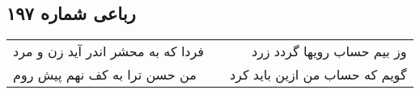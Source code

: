 \begin{center}
\section*{رباعی شماره ۱۹۷}
\label{sec:sh197}
\begin{longtable}{l p{0.5cm} r}
فردا که به محشر اندر آید زن و مرد
&&
وز بیم حساب رویها گردد زرد
\\
من حسن ترا به کف نهم پیش روم
&&
گویم که حساب من ازین باید کرد
\\
\end{longtable}
\end{center}
